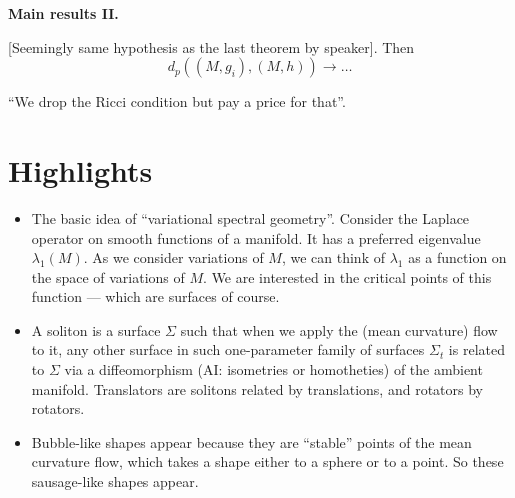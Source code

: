 \medskip\noindent
{\bf Main results II.}
\begin{theorem}[L-Lowe, 2026]
\label{theorem-ll26-2}
[Seemingly same hypothesis as the last
theorem by speaker]. Then
$$
d_p((M,g_i),(M,h)) \to …
$$
\end{theorem}

\noindent
``We drop the Ricci condition but
pay a price for that''.






\section{Highlights}
\label{section-personal-highlights}

\begin{itemize}
\item The basic idea of
``variational spectral geometry''.
Consider the Laplace operator on smooth
functions of a manifold. It has a preferred
eigenvalue $\lambda_1(M)$. As we consider
variations of $M$, we can think of 
$\lambda_1$ as a function on the 
space of variations of $M$.
We are interested in the critical points
of this function --- which are surfaces
of course.

\item A soliton is a surface $\Sigma$ such that
when we apply the (mean curvature) flow
to it, any other surface in such 
one-parameter family of surfaces $\Sigma_t$
is related to $\Sigma$ via a diffeomorphism
(AI: isometries or homotheties)
of the ambient manifold. Translators
are solitons related by translations,
and rotators by rotators.

\item Bubble-like shapes appear because
they are ``stable'' points of the mean
curvature flow, which takes a shape either
to a sphere or to a point. So these
sausage-like shapes appear.

\end{itemize}

